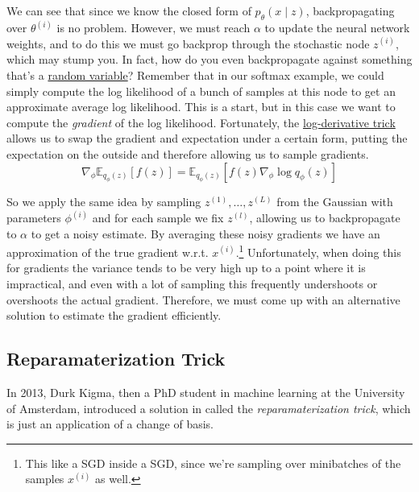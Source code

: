   We can see that since we know the closed form of $p_\theta (x \mid z)$, backpropagating over $\theta^{(i)}$ is no problem. However, we must reach $\alpha$ to update the neural network weights, and to do this we must go backprop through the stochastic node $z^{(i)}$, which may stump you. In fact, how do you even backpropagate against something that's a \hyperref[prob-def:random-variable]{random variable}? Remember that in our softmax example, we could simply compute the log likelihood of a bunch of samples at this node to get an approximate average log likelihood. This is a start, but in this case we want to compute the \textit{gradient} of the log likelihood. Fortunately, the \hyperref[gr-thm:log-derivative-trick]{log-derivative trick} allows us to swap the gradient and expectation under a certain form, putting the expectation on the outside and therefore allowing us to sample gradients. 
  \begin{equation}
    \nabla_\phi \mathbb{E}_{q_\phi (z)} [f(z)] = \mathbb{E}_{q_\phi (z)} [ f(z) \nabla_\phi \log q_{\phi} (z)]
  \end{equation}

  So we apply the same idea by sampling $z^{(1)}, \ldots, z^{(L)}$ from the Gaussian with parameters $\phi^{(i)}$ and for each sample we fix $z^{(l)}$, allowing us to backpropagate to $\alpha$ to get a noisy estimate. By averaging these noisy gradients we have an approximation of the true gradient w.r.t. $x^{(i)}$.\footnote{This like a SGD inside a SGD, since we're sampling over minibatches of the samples $x^{(i)}$ as well.} Unfortunately, when doing this for gradients the variance tends to be very high up to a point where it is impractical, and even with a lot of sampling this frequently undershoots or overshoots the actual gradient. Therefore, we must come up with an alternative solution to estimate the gradient efficiently. 

\subsection{Reparamaterization Trick} 

  In 2013, Durk Kigma, then a PhD student in machine learning at the University of Amsterdam, introduced a solution in \cite{vae} called the \textit{reparamaterization trick}, which is just an application of a change of basis. 

